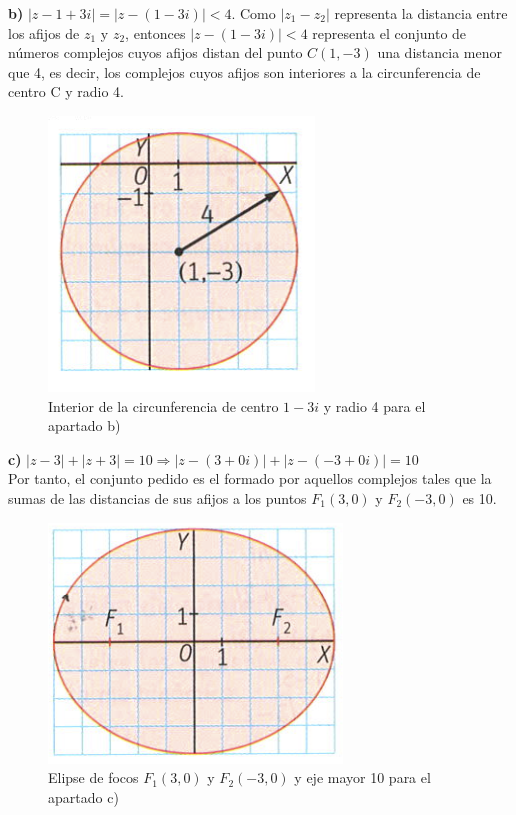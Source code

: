 \documentclass[../main.tex]{memoir}
\begin{document}
\textbf{b)} $|z-1+3i| = |z- (1-3i)| <4$. Como $|z_1-z_2|$ representa la distancia entre los afijos de $z_1$ y $z_2$, entonces $|z- (1-3i)| <4$ representa el conjunto de números complejos cuyos afijos distan del punto $C(1,-3)$ una distancia menor que 4, es decir, los complejos cuyos afijos son interiores a la circunferencia de centro C y radio 4.

\begin{figure}[H]
	\centering
	\includegraphics[scale=0.4]{images/region2.png}
	\caption{Interior de la circunferencia de centro $1-3i$ y radio 4 para el apartado b)}
	\label{region2}
\end{figure}

\textbf{c)} $|z-3|+ |z+3| = 10 \Rightarrow |z - (3+0i)| + |z - (-3+0i)| = 10$ \\
Por tanto, el conjunto pedido es el formado por aquellos complejos tales que la sumas de las distancias de sus afijos a los puntos $F_1(3,0)$ y $F_2(-3,0)$ es 10.

\begin{figure}[H]
	\centering
	\includegraphics[scale=0.4]{images/region3.png}
	\caption{Elipse de focos $F_1(3,0)$ y $F_2(-3,0)$ y eje mayor 10 para el apartado c)}
	\label{region3}
\end{figure}
\end{document}
